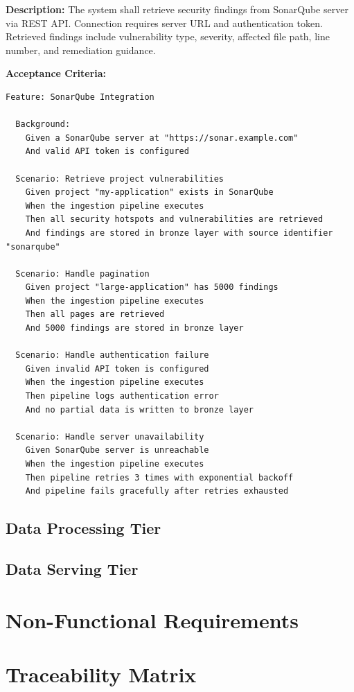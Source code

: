 \vspace{0.5em}

\noindent\textbf{Description:}
The system shall retrieve security findings from SonarQube server via REST API. Connection requires server URL and authentication token. Retrieved findings include vulnerability type, severity, affected file path, line number, and remediation guidance.

\vspace{0.5em}

\noindent\textbf{Acceptance Criteria:}

\begin{lstlisting}[language=Gherkin]
Feature: SonarQube Integration

  Background:
    Given a SonarQube server at "https://sonar.example.com"
    And valid API token is configured

  Scenario: Retrieve project vulnerabilities
    Given project "my-application" exists in SonarQube
    When the ingestion pipeline executes
    Then all security hotspots and vulnerabilities are retrieved
    And findings are stored in bronze layer with source identifier "sonarqube"

  Scenario: Handle pagination
    Given project "large-application" has 5000 findings
    When the ingestion pipeline executes
    Then all pages are retrieved
    And 5000 findings are stored in bronze layer

  Scenario: Handle authentication failure
    Given invalid API token is configured
    When the ingestion pipeline executes
    Then pipeline logs authentication error
    And no partial data is written to bronze layer

  Scenario: Handle server unavailability
    Given SonarQube server is unreachable
    When the ingestion pipeline executes
    Then pipeline retries 3 times with exponential backoff
    And pipeline fails gracefully after retries exhausted
\end{lstlisting}


\subsection{Data Processing Tier}

\subsection{Data Serving Tier}

\section{Non-Functional Requirements}

\section{Traceability Matrix}

